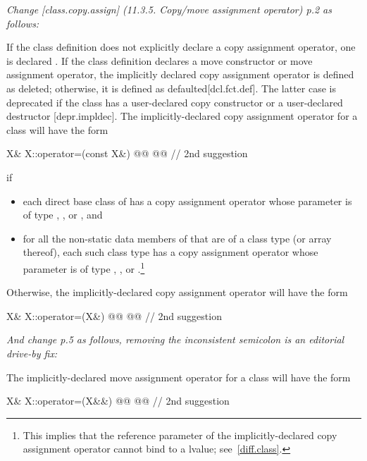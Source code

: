 \documentclass[ebook,11pt,article]{memoir}
\renewcommand{\iref}[1]{[#1]}
\begin{document}
\pnum
\emph{Change [class.copy.assign] (11.3.5. Copy/move assignment operator) p.2 as follows:}

\pnum
If the class definition does not explicitly declare a copy assignment operator,
one is declared .
If the class definition declares a move
constructor or move assignment operator, the implicitly declared copy
assignment operator is defined as deleted; otherwise, it is defined as
defaulted\iref{dcl.fct.def}.
The latter case is deprecated if the class has a user-declared copy constructor
or a user-declared destructor \iref{depr.impldec}.
The implicitly-declared copy assignment operator for a class
will have the form
\begin{codeblock}
X& X::operator=(const X&) @\added{\tcode{\&}}@
@@ // 2nd suggestion
\end{codeblock}
if
\begin{itemize}
\item
each direct base class  of 
has a copy assignment operator whose parameter is of type
, , or , and
\item
for all the non-static data members of 
that are of a class type  (or array thereof),
each such class type has a copy assignment operator whose parameter is of type
, ,
or .\footnote{This implies that the reference parameter of the
implicitly-declared copy assignment operator cannot bind to a
 lvalue; see~\ref{diff.class}.}
\end{itemize}

Otherwise, the implicitly-declared copy assignment operator
will have the form
\begin{codeblock}
X& X::operator=(X&) @\added{\tcode{\&}}@
@@ // 2nd suggestion
\end{codeblock}


\pnum
\pnum
\emph{And change p.5 as follows, removing the inconsistent semicolon is an editorial drive-by fix:}

\pnum
The implicitly-declared move assignment operator for a class  will have the form
\begin{codeblock}
X& X::operator=(X&&) @\added{\tcode{\&}}\removed{\tcode{;}}@
@@ // 2nd suggestion
\end{codeblock}
\end{document}
